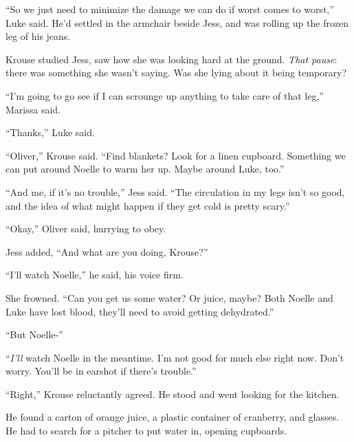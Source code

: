 ``So we just need to minimize the damage we can do if worst comes to worst,'' Luke said.  He'd settled in the armchair beside Jess, and was rolling up the frozen leg of his jeans.



Krouse studied Jess, saw how she was looking hard at the ground.  \emph{That pause}: there was something she wasn't saying.  Was she lying about it being temporary?



``I'm going to go see if I can scrounge up anything to take care of that leg,'' Marissa said.



``Thanks,'' Luke said.



``Oliver,'' Krouse said.  ``Find blankets?  Look for a linen cupboard.  Something we can put around Noelle to warm her up.  Maybe around Luke, too.''



``And me, if it's no trouble,'' Jess said.  ``The circulation in my legs isn't so good, and the idea of what might happen if they get cold is pretty scary.''



``Okay,'' Oliver said, hurrying to obey.



Jess added, ``And what are you doing, Krouse?''



``I'll watch Noelle,'' he said, his voice firm.



She frowned.  ``Can you get us some water?  Or juice, maybe?  Both Noelle and Luke have lost blood, they'll need to avoid getting dehydrated.''



``But Noelle-''



``\emph{I'll} watch Noelle in the meantime.  I'm not good for much else right now.  Don't worry.  You'll be in earshot if there's trouble.''



``Right,''  Krouse reluctantly agreed.  He stood and went looking for the kitchen.



He found a carton of orange juice, a plastic container of cranberry, and glasses.  He had to search for a pitcher to put water in, opening cupboards.



